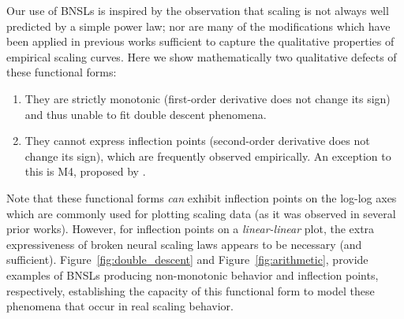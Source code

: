\documentclass{article} %
\begin{document}


Our use of BNSLs is inspired by the observation that scaling is not always well predicted by a simple power law;
nor are many of the modifications which have been applied in previous works sufficient to capture the qualitative properties of empirical scaling curves.  
Here we show mathematically two qualitative defects of these functional forms:
\begin{enumerate}
    \item They are strictly monotonic (first-order derivative does not change its sign) and thus unable to fit double descent phenomena.
    \item They cannot express inflection points (second-order derivative does not change its sign), which are frequently observed empirically.  An exception to this is M4, proposed by \citet{Alabdulmohsi2022revisiting}. %
\end{enumerate}
Note that these functional forms \textit{can} exhibit inflection points on the log-log axes which are commonly used for plotting scaling data (as it was observed in several prior works).
However, for inflection points on a \textit{linear-linear} plot, the extra expressiveness of broken neural scaling laws appears to be necessary (and sufficient).
Figure~\ref{fig:double_descent} and Figure~\ref{fig:arithmetic}, provide examples of BNSLs producing non-monotonic behavior and inflection points, respectively, establishing the capacity of this functional form to model these phenomena that occur in real scaling behavior.
\end{document}
